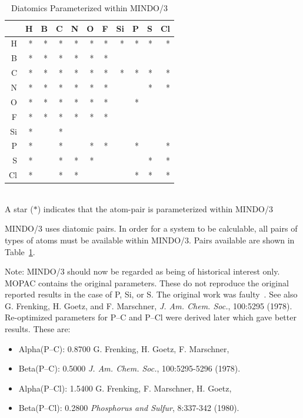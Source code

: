 \begin{table}[htb]
\begin{center}
\caption{\label{mindo3el} Diatomics Parameterized within  MINDO/3}
\begin{tabular}{rrrrrrrrrrr}
    &H & B & C & N & O & F &Si & P & S &Cl  \\    \hline
  H &* & * & * & * & * & * & * & * & * & *   \\
  B &* & * & * & * & * & * &   &   &   &      \\
  C &* & * & * & * & * & * & * & * & * & *  \\
  N &* & * & * & * & * & * &   &   & * & *  \\
  O &* & * & * & * & * & * &   & * & &  \\
  F &* & * & * & * & * & * &   & &  \\
 Si &* &   & * &       &   & &  \\
  P &* &   & * &   & * & * &   & * &   & *  \\
  S &* &   & * & * & * &   &   &   & * & *  \\
 Cl &* &   & * & * &   &   &   & * & * & *
\end{tabular}\\
A star ($*$) indicates that the atom-pair is parameterized within MINDO/3\\
\end{center}
\end{table}
MINDO/3 uses diatomic pairs.  In order for a system to be calculable, all
pairs of types of atoms must be available within MINDO/3.  Pairs
available are shown in Table~\ref{mindo3el}.

Note:  MINDO/3  should  now  be  regarded  as  being  of  historical
interest  only.   MOPAC  contains  the original parameters.  These do not
reproduce the original reported results in the case of P, Si, or S.   The
original  work  was  faulty~\cite{mindo3-p}. \label{mindo3-p}
See also G. Frenking, H. Goetz, and F. Marschner,
{\em J. Am. Chem. Soc.}, 100:5295 (1978).
Re-optimized parameters  for  P--C  and  P--Cl
were derived later which gave better results.  These are:
\begin{itemize}
\item Alpha(P--C):  0.8700  G. Frenking, H. Goetz, F. Marschner,
\item Beta(P--C):   0.5000  {\em J. Am. Chem. Soc.}, 100:5295-5296 (1978).
\item Alpha(P--Cl): 1.5400  G. Frenking, F. Marschner, H. Goetz,
\item Beta(P--Cl):  0.2800  {\em Phosphorus and Sulfur}, 8:337-342 (1980).
\end{itemize}

